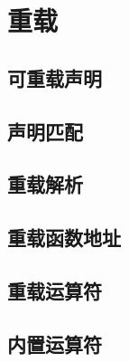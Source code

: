 
\chapter{重载}

\section{可重载声明}
\section{声明匹配}
\section{重载解析}
\section{重载函数地址}
\section{重载运算符}
\section{内置运算符}
